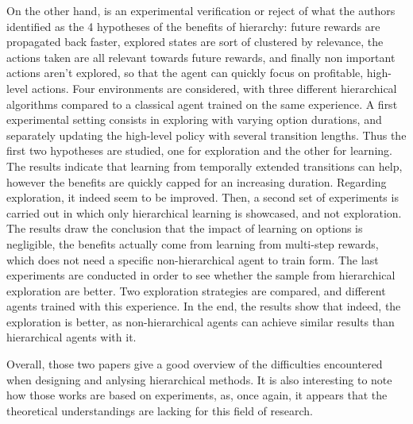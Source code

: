 On the other hand, \citep{nachum_why_2019} is an experimental verification or reject of what the authors identified as the 4 hypotheses of the benefits of hierarchy: future rewards are propagated back faster, explored states are sort of clustered by relevance, the actions taken are all relevant towards future rewards, and finally non important actions aren't explored, so that the agent can quickly focus on profitable, high-level actions. Four environments are considered, with three different hierarchical algorithms compared to a classical agent trained on the same experience. A first experimental setting consists in exploring with varying option durations, and separately updating the high-level policy with several transition lengths. Thus the first two hypotheses are studied, one for exploration and the other for learning. The results indicate that learning from temporally extended transitions can help, however the benefits are quickly capped for an increasing duration. Regarding exploration, it indeed seem to be improved. Then, a second set of experiments is carried out in which only hierarchical learning is showcased, and not exploration. The results draw the conclusion that the impact of learning on options is negligible, the benefits actually come from learning from multi-step rewards, which does not need a specific non-hierarchical agent to train form. The last experiments are conducted in order to see whether the sample from hierarchical exploration are better. Two exploration strategies are compared, and different agents trained with this experience. In the end, the results show that indeed, the exploration is better, as non-hierarchical agents can achieve similar results than hierarchical agents with it.

Overall, those two papers give a good overview of the difficulties encountered when designing and anlysing hierarchical methods. It is also interesting to note how those works are based on experiments, as, once again, it appears that the theoretical understandings are lacking for this field of research.
